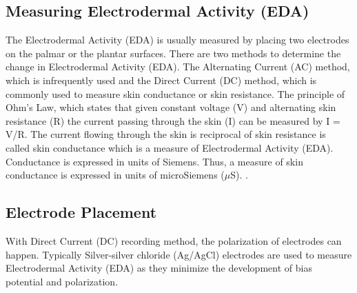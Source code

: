\subsection{Measuring Electrodermal Activity (EDA)}
The Electrodermal Activity (EDA) is usually measured by placing two electrodes on the palmar or the plantar surfaces. There are two methods to determine the change in Electrodermal Activity (EDA). The Alternating Current (AC) method, which is infrequently used and the Direct Current (DC) method, which is commonly used to measure skin conductance or skin resistance. The principle of Ohm's Law, which states that given constant voltage (V) and alternating skin resistance (R) the current passing through the skin (I) can be measured by I = V/R. The current flowing through the skin is reciprocal of skin resistance is called skin conductance which is a measure of Electrodermal Activity (EDA). Conductance is expressed in units of Siemens. Thus, a measure of skin conductance is expressed in units of microSiemens ($\mu$S). \cite{cacioppo_electrodermal_2016_p_217_243}.

\subsection{Electrode Placement}
\label{sec:electrode_placement}
With Direct Current (DC) recording method, the polarization of electrodes can happen. Typically Silver-silver chloride (Ag/AgCl) electrodes are used to measure Electrodermal Activity (EDA) as they minimize the development of bias potential and polarization.

